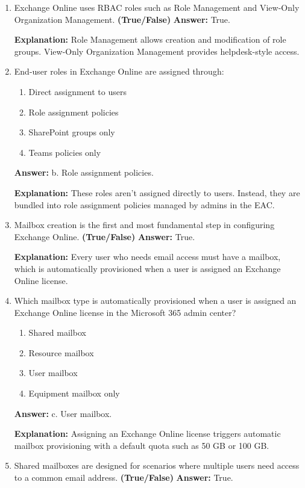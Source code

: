 \documentclass[10pt]{article}
\begin{document}
\begin{enumerate}[leftmargin=*]
\item Exchange Online uses RBAC roles such as Role Management and View-Only Organization Management. \textbf{(True/False)}
\textbf{Answer:} True.

\textbf{Explanation:} Role Management allows creation and modification of role groups. View-Only Organization Management provides helpdesk-style access.

\item End-user roles in Exchange Online are assigned through:
\begin{enumerate}[label=\alph*., leftmargin=1.5em]
\item Direct assignment to users
\item Role assignment policies
\item SharePoint groups only
\item Teams policies only
\end{enumerate}
\textbf{Answer:} b. Role assignment policies.

\textbf{Explanation:} These roles aren’t assigned directly to users. Instead, they are bundled into role assignment policies managed by admins in the EAC.

\item Mailbox creation is the first and most fundamental step in configuring Exchange Online. \textbf{(True/False)}
\textbf{Answer:} True.

\textbf{Explanation:} Every user who needs email access must have a mailbox, which is automatically provisioned when a user is assigned an Exchange Online license.

\item Which mailbox type is automatically provisioned when a user is assigned an Exchange Online license in the Microsoft 365 admin center?
\begin{enumerate}[label=\alph*., leftmargin=1.5em]
\item Shared mailbox
\item Resource mailbox
\item User mailbox
\item Equipment mailbox only
\end{enumerate}
\textbf{Answer:} c. User mailbox.

\textbf{Explanation:} Assigning an Exchange Online license triggers automatic mailbox provisioning with a default quota such as 50 GB or 100 GB.

\item Shared mailboxes are designed for scenarios where multiple users need access to a common email address. \textbf{(True/False)}
\textbf{Answer:} True.


\end{enumerate}
\end{document}
